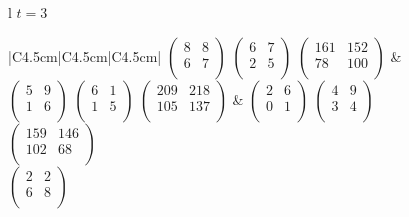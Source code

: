 \begin{przyklad}
\begin{figure}[H]
\begin{tabular}{l}
\normalsize{\(t=3\)} \\
\begin{tabular}{|C{4.5cm}|C{4.5cm}|C{4.5cm}|}
\hline
\(\begin{pmatrix}
        8 & 8 \\
        6 & 7 \\    
\end{pmatrix}\)
\(\begin{pmatrix}
        6 & 7 \\
        2 & 5 \\    
\end{pmatrix}\)
\(\begin{pmatrix}
       161 & 152 \\
        78 & 100 \\    
\end{pmatrix}\) &
\(\begin{pmatrix}
        5 & 9 \\
        1 & 6 \\    
\end{pmatrix}\)
\(\begin{pmatrix}
        6 & 1 \\
        1 & 5 \\    
\end{pmatrix}\)
\(\begin{pmatrix}
        209 & 218 \\
        105 & 137 \\    
\end{pmatrix}\) &
\(\begin{pmatrix}
        2 & 6 \\
        0 & 1 \\    
\end{pmatrix}\)
 \(\begin{pmatrix}
        4 & 9 \\
        3 & 4 \\    
\end{pmatrix}\)
\(\begin{pmatrix}
        159 & 146 \\
        102 & 68 \\    
\end{pmatrix}\) \\
\hline
\(\begin{pmatrix}
        2 & 2 \\
        6 & 8 \\    
\end{pmatrix}\)

\end{tabular}
\end{tabular}
\end{figure}
\end{przyklad}
